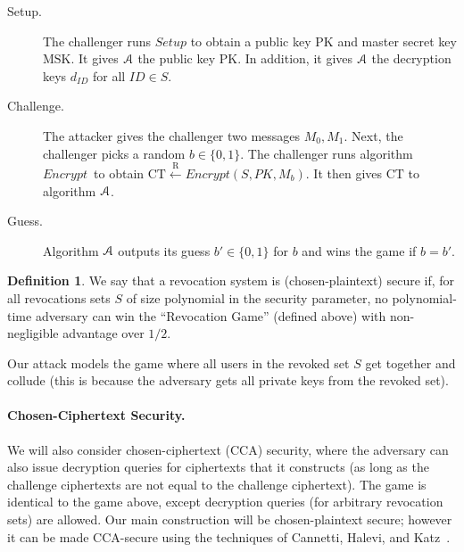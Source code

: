 \documentclass[a4paper, 11pt]{article}
\newtheorem{definition}[theorem]{Definition}
\newenvironment{gamequote}
               {\list{}{\rightmargin0pt\relax}\item\relax}
               {\endlist}
\theoremstyle{definition}
\newtheorem{definition}[theorem]{Definition}
\newcommand{\rgets}{\ensuremath{\stackrel{\mathrm{R}}{\gets}}}
\newcommand{\AlgSetup}{\ensuremath{\textit{Setup}}}
\newcommand{\AlgEncrypt}{\ensuremath{\textit{Encrypt}}}
\newcommand{\AlgA}{\ensuremath{{\cal A}}}
\newcommand{\MSK}{\ensuremath{\textrm{MSK}}}
\newcommand{\PK}{\ensuremath{\textrm{PK}}}
\newcommand{\CT}{\ensuremath{\textrm{CT}}}
\begin{document}
\begin{gamequote}
\begin{description}


\item[Setup.]  The challenger runs $\AlgSetup$ to obtain a public
key $\PK$ and master secret key $\MSK$.  It gives $\AlgA$ the
public key $\PK$.  In addition, it gives $\AlgA$ the decryption keys $d_{ID}$ for all $ID \in S$.

\item[Challenge.] The attacker gives the challenger two messages $M_0,M_1$.
Next, the challenger picks a random $b \in \{0,1\}$.
The challenger runs algorithm \AlgEncrypt\ to obtain
$\CT \rgets \AlgEncrypt(S,PK,M_b)$.
It then gives $\CT$ to algorithm $\AlgA$.

\item[Guess.] Algorithm $\AlgA$ outputs its guess $b' \in \{0,1\}$ for $b$ and wins the game if $b=b'$.

\end{description}
\end{gamequote}


\begin{definition}
We say that a revocation system is (chosen-plaintext) secure if,
for all revocations sets $S$ of size polynomial in the security parameter, no polynomial-time adversary can win the ``Revocation Game'' (defined above) with non-negligible advantage over $1/2$.
\end{definition}

Our attack models the game where all users in the revoked set $S$ get together and collude (this is because the adversary gets all private keys from the revoked set).


\paragraph{Chosen-Ciphertext Security.} We will also consider  chosen-ciphertext (CCA) security, where the adversary can also issue decryption queries for ciphertexts that it constructs (as long as the challenge ciphertexts are not equal to the challenge ciphertext). The game is identical to the game above, except decryption queries (for arbitrary revocation sets) are allowed. Our main construction will be chosen-plaintext secure; however it can be made CCA-secure using the techniques of Cannetti, Halevi,
and Katz~\cite{CHK2}.
\end{document}

